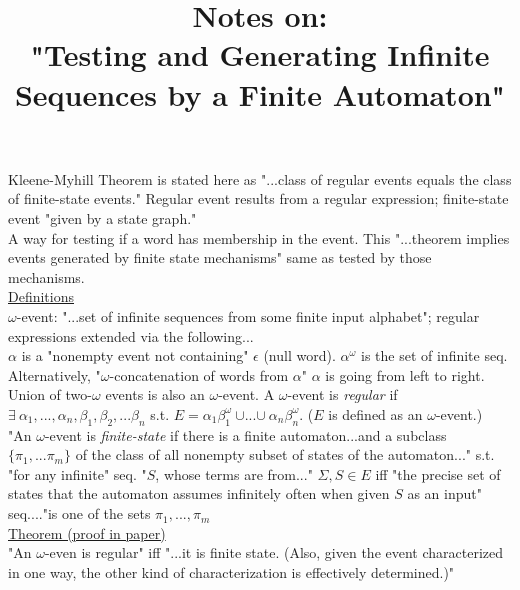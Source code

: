 \documentclass[12pt]{article}
\title{Notes on:\\"Testing and Generating Infinite Sequences by a Finite Automaton"}
\author{}
\date{} %
\begin{document}
\maketitle

Kleene-Myhill Theorem is stated here as "...class of regular events equals the class of finite-state events."  Regular event results from a regular expression; finite-state event "given by a state graph."\\
A way for testing if a word has membership in the event.  This "...theorem implies events generated by finite state mechanisms" same as tested by those mechanisms.\\
\underline{Definitions}\\ 
$\omega$-event: "...set of infinite sequences from some finite input alphabet"; regular expressions extended via the following...\\
$\alpha$ is a "nonempty event not containing" $\epsilon$ (null word). $\alpha^{\omega}$ is the set of infinite seq.  Alternatively, "$\omega$-concatenation of words from $\alpha$" $\alpha$ is going from left to right.  Union of two-$\omega$ events is also an $\omega$-event.  A $\omega$-event is \textit{regular} if $\exists \ \alpha_{1}, ..., \alpha_{n}, \beta_{1}, \beta_{2}, ... \beta_{n}$ s.t. $E = \alpha_{1}\beta_{1}^{\omega} \ \mathbf{\cup} ... \mathbf{\cup} \ \alpha_{n}\beta_{n}^{\omega}$. ($E$ is defined as an $\omega$-event.)\\
"An $\omega$-event is \textit{finite-state} if there is a finite automaton...and a subclass $\{ \pi_{1}, ... \pi_{m} \}$ of the class of all nonempty subset of states of the automaton..." s.t. "for any infinite" seq. "$S$, whose terms are from..." $\Sigma, S \in E$ iff "the precise set of states that the automaton assumes infinitely often when given $S$ as an input" seq...."is one of the sets $\pi_{1}, ..., \pi_{m}$\\
\underline{Theorem (proof in paper)}\\
"An $\omega$-even is regular" iff "...it is finite state. (Also, given the event characterized in one way, the other kind of characterization is effectively determined.)"
\end{document}
